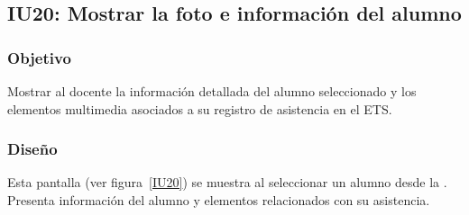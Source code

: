 \subsection{IU20: Mostrar la foto e información del alumno}


\newpage

\subsubsection{Objetivo}
Mostrar al docente la información detallada del alumno seleccionado y los elementos multimedia asociados a su registro de asistencia en el ETS.

\subsubsection{Diseño}
Esta pantalla  (ver figura~\ref{IU20}) se muestra al seleccionar un alumno desde la . Presenta información del alumno y elementos relacionados con su asistencia.




